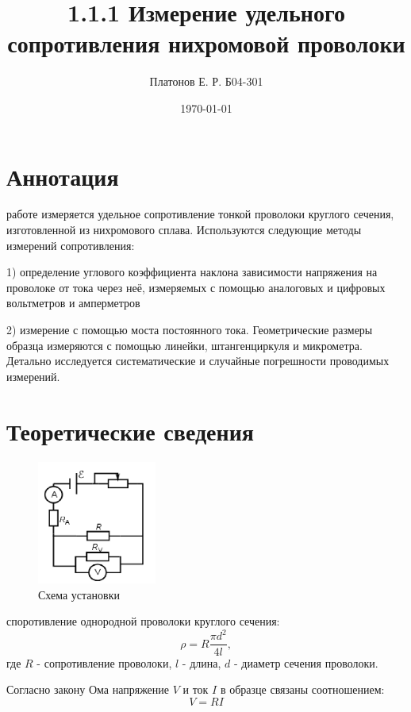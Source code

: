 \documentclass[a4paper,12pt]{article} %
\author{Платонов Е. Р. Б04-301}
\title{\textbf{1.1.1 Измерение удельного сопротивления нихромовой проволоки}}
\date{\today}
\begin{document}
\maketitle

\section{Аннотация}
 работе измеряется удельное сопротивление тонкой проволоки круглого сечения, изготовленной из нихромового сплава. Используются следующие методы измерений сопротивления:

1) определение углового коэффициента наклона зависимости напряжения на проволоке от тока 
через неё, измеряемых с помощью аналоговых и цифровых вольтметров и амперметров

2) измерение с помощью моста постоянного тока. Геометрические размеры образца измеряются с 
помощью линейки, штангенциркуля и микрометра. Детально исследуется систематические и 
случайные погрешности проводимых измерений.

\section{Теоретические сведения}

\begin{figure}
\centering
\includegraphics[width=0.35\textwidth]{imgs/схема1.png}
\caption{\label{схема}Схема установки}
\end{figure}

 споротивление однородной проволоки круглого сечения:
\begin{equation}\label{удсоп}
\rho=R\frac{\pi d^2}{4l},
\end{equation}
где $R$ - сопротивление проволоки, $l$ - длина, $d$ - диаметр сечения проволоки.

Согласно закону Ома напряжение $V$ и ток $I$ в образце связаны соотношением:
\begin{equation}
V=RI
\end{equation}
\end{document}
